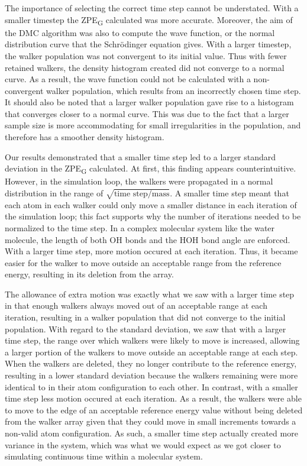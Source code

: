 \documentclass[journal=jacsat,manuscript=article]{achemso}
\begin{document}
The importance of selecting the correct time step cannot be understated. With a smaller timestep the ZPE\textsubscript{G} calculated was more accurate. Moreover, the aim of the DMC algorithm was also to compute the wave function, or the normal distribution curve that the Schr\"odinger equation gives. With a larger timestep, the walker population was not convergent to its initial value. Thus with fewer retained walkers, the density histogram created did not converge to a normal curve. As a result, the wave function could not be calculated with a non-convergent walker population, which results from an incorrectly chosen time step. It should also be noted that a larger walker population gave rise to a histogram that converges closer to a normal curve. This was due to the fact that a larger sample size is more accommodating for small irregularities in the population, and therefore has a smoother density histogram. 

Our results demonstrated that a smaller time step led to a larger standard deviation in the ZPE\textsubscript{G} calculated. At first, this finding appears counterintuitive. However, in the simulation loop, the walkers were propagated in a normal distribution in the range of $\sqrt{\text{time step}/\text{mass}}$. A smaller time step meant that each atom in each walker could only move a smaller distance in each iteration of the simulation loop; this fact supports why the number of iterations needed to be normalized to the time step. In a complex molecular system like the water molecule, the length of both OH bonds and the HOH bond angle are enforced. With a larger time step, more motion occured at each iteration. Thus, it became easier for the walker to move outside an acceptable range from the reference energy, resulting in its deletion from the array. 

The allowance of extra motion was exactly what we saw with a larger time step in that enough walkers always moved out of an acceptable range at each iteration, resulting in a walker population that did not converge to the initial population. With regard to the standard deviation, we saw that with a larger time step, the range over which walkers were likely to move is increased, allowing a larger portion of the walkers to move outside an acceptable range at each step. When the walkers are deleted, they no longer contribute to the reference energy, resulting in a lower standard deviation because the walkers remaining were more identical to in their atom configuration to each other. In contrast, with a smaller time step less motion occured at each iteration. As a result, the walkers were able to move to the edge of an acceptable reference energy value without being deleted from the walker array given that they could move in small increments towards a non-valid atom configuration. As such, a smaller time step actually created more variance in the system, which was what we would expect as we got closer to simulating continuous time within a molecular system. 
\end{document}

